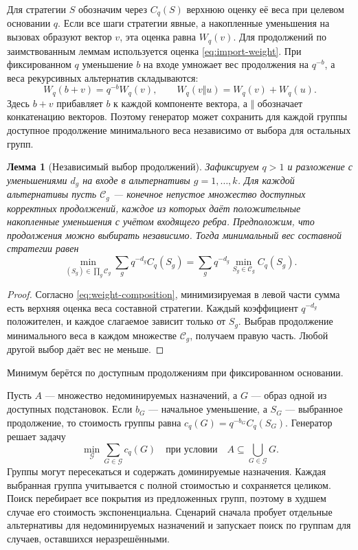 \documentclass[10pt,twoside]{article}
\newtheorem{lemma}[theorem]{Лемма}
\theoremstyle{definition}
\theoremstyle{remark}
\begin{document}
Для стратегии $S$ обозначим через $C_q(S)$ верхнюю оценку её веса при
целевом основании $q$. Если все шаги стратегии явные, а накопленные
уменьшения на вызовах образуют вектор $v$, эта оценка равна $W_q(v)$.
Для продолжений по заимствованным леммам используется оценка
\eqref{eq:import-weight}.
При фиксированном $q$ уменьшение $b$ на входе умножает вес продолжения на
$q^{-b}$, а веса рекурсивных альтернатив складываются:
\begin{equation}
 W_q(b+v)=q^{-b}W_q(v),\qquad
 W_q(v\Vert u)=W_q(v)+W_q(u).
 \label{eq:weight-composition}
\end{equation}
Здесь $b+v$ прибавляет $b$ к каждой компоненте вектора, а $\Vert$
обозначает конкатенацию векторов. Поэтому генератор может сохранить для
каждой группы доступное продолжение минимального веса независимо от
выбора для остальных групп.
\begin{lemma}[Независимый выбор продолжений]
\label{lem:weight-selection}
Зафиксируем $q>1$ и разложение с уменьшениями $d_g$ на входе в
альтернативы $g=1,\ldots,k$. Для каждой альтернативы пусть $\mathcal C_g$ ---
конечное непустое множество доступных корректных продолжений, каждое из
которых даёт положительные накопленные уменьшения с учётом входящего
ребра. Предположим, что продолжения можно выбирать независимо. Тогда
минимальный вес составной стратегии равен
\begin{equation}
 \min_{(S_g)\in\prod_g\mathcal C_g}
   \sum_g q^{-d_g}C_q(S_g)
 =\sum_g q^{-d_g}\min_{S_g\in\mathcal C_g}C_q(S_g).
 \label{eq:independent-selection}
\end{equation}
\end{lemma}
\begin{proof}
Согласно \eqref{eq:weight-composition}, минимизируемая в левой части
сумма есть верхняя оценка веса составной стратегии. Каждый коэффициент
$q^{-d_g}$ положителен, и каждое слагаемое зависит только от $S_g$.
Выбрав продолжение минимального веса в каждом множестве $\mathcal C_g$,
получаем правую часть. Любой другой выбор даёт вес не меньше.
\end{proof}
Минимум берётся по доступным продолжениям при фиксированном основании.

Пусть $A$ --- множество недоминируемых назначений, а $G$ --- образ
одной из доступных подстановок. Если $b_G$ --- начальное уменьшение,
а $S_G$ --- выбранное продолжение, то стоимость группы равна
$c_q(G)=q^{-b_G}C_q(S_G)$. Генератор решает задачу
\begin{equation}
 \min_{\mathcal G}\sum_{G\in\mathcal G}c_q(G)
 \quad\text{при условии}\quad A\subseteq\bigcup_{G\in\mathcal G}G.
 \label{eq:group-cover}
\end{equation}
Группы могут пересекаться и содержать доминируемые назначения. Каждая
выбранная группа учитывается с полной стоимостью и сохраняется целиком.
Поиск перебирает все покрытия из предложенных групп, поэтому в худшем
случае его стоимость экспоненциальна. Сценарий сначала пробует отдельные
альтернативы для недоминируемых назначений и запускает поиск по группам
для случаев, оставшихся неразрешёнными.
\end{document}
